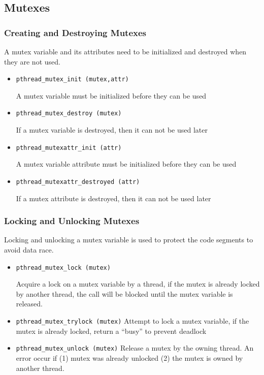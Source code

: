 \subsection{Mutexes}
\subsubsection{Creating and Destroying Mutexes}
A mutex variable and its attributes need to be initialized and destroyed when
they are not used.
\begin{itemize}

  \item \texttt{pthread\_mutex\_init (mutex,attr)}

  A mutex variable must be initialized before they can be used

  \item \texttt{pthread\_mutex\_destroy (mutex)}

  If a mutex variable is destroyed, then it can not be used later

  \item \texttt{pthread\_mutexattr\_init (attr)}

  A mutex variable attribute must be initialized before they can be used

  \item \texttt{pthread\_mutexattr\_destroyed (attr)}

  If a mutex attribute is destroyed, then it can not be used later
  
\end{itemize}

\subsubsection{Locking and Unlocking Mutexes}
Locking and unlocking a mutex variable is used to protect the code segments to
avoid data race.

\begin{itemize}
  \item \texttt{pthread\_mutex\_lock (mutex)}
  
  Acquire a lock on a mutex variable by a thread, if the mutex is already
  locked by another thread, the call will be blocked until the mutex variable is released.
  
  \item \texttt{pthread\_mutex\_trylock (mutex)}
  Attempt to lock a mutex variable, if the mutex is already locked, return a
  ``busy'' to prevent deadlock 
  
  \item \texttt{pthread\_mutex\_unlock (mutex)}
  Release a mutex by the owning thread. An error occur if (1) mutex was already
  unlocked (2) the mutex is owned by another thread.
  
\end{itemize}


